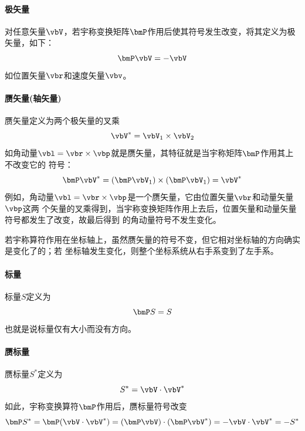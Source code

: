 \paragraph*{极矢量}
对任意矢量$\vbV$，若宇称变换矩阵$\bmP$作用后使其符号发生改变，将其定义为极矢量，如下：
\begin{equation}
    \bmP \vbV = -\vbV
    \label{eq:polar-vector}
\end{equation}
如位置矢量$\vbr$和速度矢量$\vbv$。

\paragraph*{赝矢量(轴矢量)}
赝矢量定义为两个极矢量的叉乘
\begin{equation}
    \vbV^{\ast} = \vbV_1 \times \vbV_2
    \label{eq:pesudovectors-def}
\end{equation}
如角动量$\vbl = \vbr \times \vbp$就是赝矢量，其特征就是当宇称矩阵$\bmP$作用其上不改变它的
符号：
\begin{equation}
    \bmP \vbV^{\ast} = (\bmP \vbV_1) \times (\bmP \vbV_1) = \vbV^{\ast}
    \label{eq:pesudovec-parity}
\end{equation}
例如，角动量$\vbl = \vbr \times \vbp$是一个赝矢量，它由位置矢量$\vbr$和动量矢量$\vbp$这两
个矢量的叉乘得到，当宇称变换矩阵作用上去后，位置矢量和动量矢量符号都发生了改变，故最后得到
的角动量符号不发生变化。
\begin{note}
    若宇称算符作用在坐标轴上，虽然赝矢量的符号不变，但它相对坐标轴的方向确实是变化了的；若
    坐标轴发生变化，则整个坐标系统从右手系变到了左手系。
\end{note}

\paragraph*{标量}
标量$S$定义为
\begin{equation}
    \bmP S = S
    \label{eq:scalar-def}
\end{equation}
也就是说标量仅有大小而没有方向。

\paragraph*{赝标量}
赝标量$S^{\ast}$定义为
\begin{equation}
    S^{\ast} = \vbV \cdot \vbV^{\ast}
    \label{eq:pseudoscalar-def}
\end{equation}
如此，宇称变换算符$\bmP$作用后，赝标量符号改变
\begin{equation}
    \bmP S^{\ast} = \bmP (\vbV \cdot \vbV^{\ast}) = (\bmP \vbV) \cdot (\bmP\vbV^{\ast})
                  = -\vbV \cdot \vbV^{\ast} = -S^{\ast}
    \label{eq:pseudoscalar-prop1}
\end{equation}


